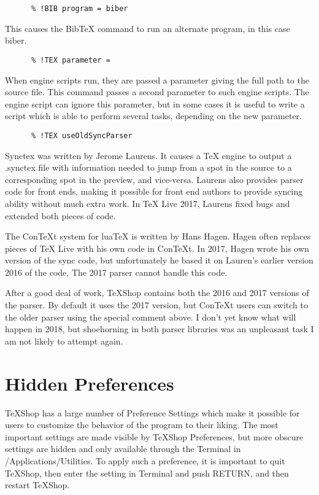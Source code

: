 \documentclass[11pt, oneside]{article}   	%
\begin{document}
  \begin{verbatim}
      % !BIB program = biber
 \end{verbatim}
 This causes the BibTeX command to run an alternate program, in this case biber.    
  
  \begin{verbatim}
      % !TEX parameter = 
 \end{verbatim}
When engine scripts run, they are passed a parameter giving the full path to the source file. This command passes a second parameter to such engine scripts. The engine script can ignore this parameter, but in some cases it is useful to write a script which is able to perform several tasks, depending on the new parameter.  
     
  \begin{verbatim}
      % !TEX useOldSyncParser
 \end{verbatim}
Synctex was written by Jerome Laurens. It causes a TeX engine to output a .synctex file with information needed to jump from a spot in the source to a corresponding spot in the preview, and vice-versa. Laurens also provides parser code for front ends, making it possible for front end authors to provide syncing ability without much extra work. In TeX Live 2017, Laurens fixed bugs and extended both pieces of code.

The ConTeXt system for luaTeX is written by Hans Hagen. Hagen often replaces pieces of TeX Live with his own code in ConTeXt. In 2017, Hagen wrote his own version of the sync code, but unfortunately he based it on Lauren's earlier version 2016 of the code, The 2017 parser cannot handle this code.

After a good deal of work, TeXShop contains both the 2016 and 2017 versions of the parser. By default it uses the 2017 version, but ConTeXt users can switch to the older parser using the special comment above. I don't yet know what will happen in 2018, but shoehorning in both parser libraries was an unpleasant task I am not likely to attempt again.

\newpage
\section{Hidden Preferences}
TeXShop has a large number of Preference Settings which make it possible for users to customize the behavior of the program to their liking. The most important settings are made visible by TeXShop Preferences, but more obscure settings are hidden and only available through the Terminal in /Applications/Utilities. To apply such a preference, it is important to quit TeXShop, then enter the setting in Terminal and push RETURN, and then restart TeXShop. 
\end{document}
